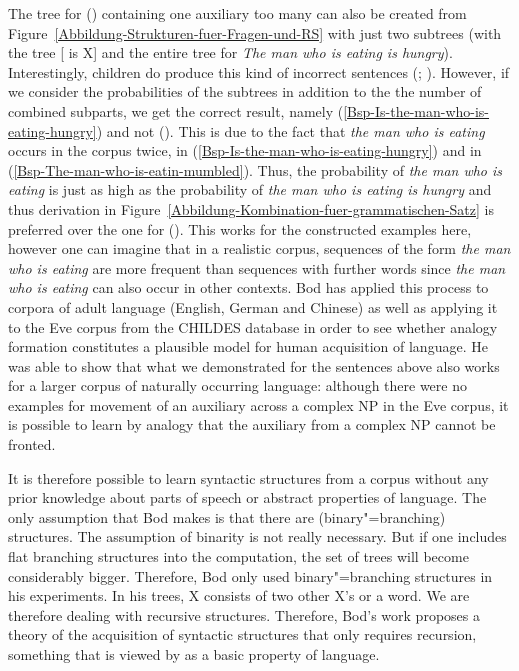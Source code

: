 The tree for () containing one auxiliary too many can also be created from Figure~\ref{Abbildung-Strukturen-fuer-Fragen-und-RS} with just two subtrees 
(with the tree [ is X] and the entire tree for \emph{The man who is eating is hungry}).
\z
Interestingly, children do produce this kind of incorrect sentences (\citealp[]{CN87a-u}; \citealp*{ARP2008a}). 
However, if we consider the probabilities of the subtrees in addition to the the number of combined
subparts, we get the correct result, namely (\ref{Bsp-Is-the-man-who-is-eating-hungry}) and not ().
This is due to the fact that \emph{the man who is eating} occurs in the corpus twice, in (\ref{Bsp-Is-the-man-who-is-eating-hungry}) and in
(\ref{Bsp-The-man-who-is-eatin-mumbled}).
Thus, the probability of \emph{the man who
  is eating} is just as high as the probability of \emph{the man who is eating is hungry} and thus derivation in Figure~\ref{Abbildung-Kombination-fuer-grammatischen-Satz} 
  is preferred over the one for ().
This works for the constructed examples here, however one can imagine that in a realistic corpus, sequences of the form \emph{the man who is eating} are more frequent
than sequences with further words since \emph{the man who is eating} can also occur in other contexts.
Bod has applied this process to corpora of adult language (English, German and Chinese) as well as
applying it to the Eve corpus from the CHILDES database in order to see whether analogy formation constitutes a plausible model
for human acquisition of language. He was able to show that what we demonstrated for
the sentences above also works for a larger corpus of
naturally occurring language: although there were no examples for movement of an auxiliary across a complex NP in the Eve corpus, it is possible to learn
by analogy that the auxiliary from a complex NP cannot be fronted.

It is therefore possible to learn syntactic structures from a corpus without any prior knowledge
about parts of speech or abstract properties of language.
The only assumption that Bod makes is that there are (binary"=branching) structures. The assumption of binarity is not really
necessary. But if one includes flat branching structures into the computation, the set of trees will
become considerably bigger. Therefore, Bod only used binary"=branching structures in his
experiments. In his trees, X consists of two other X's or a word. We are therefore dealing with
recursive structures. Therefore, Bod's work proposes a theory of the acquisition of
syntactic structures that only requires recursion, something that is viewed by \citet*{HCF2002a} as a basic property of language.

